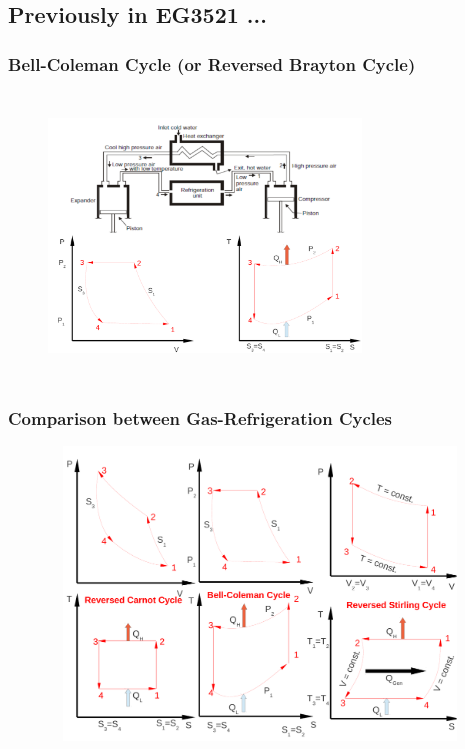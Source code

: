 \documentclass[10pt,compress]{beamer}
\begin{document}
\subsection{Previously in EG3521 ...}
\begin{frame}
 \frametitle{Bell-Coleman Cycle (or Reversed Brayton Cycle)}
    \begin{figure}%
     \begin{center}
      \includegraphics[width=8.3cm,height=7.6cm]{./Pics/Overview_Refrig6}
     \end{center}
    \end{figure}  
\end{frame}
\begin{frame}
 \frametitle{Comparison between Gas-Refrigeration Cycles}

    \begin{figure}%
     \begin{center}
      \includegraphics[width=11.5cm,height=7.8cm]{./Pics/Overview_Refrig10}
     \end{center}
    \end{figure}  

\end{frame}
\end{document}
